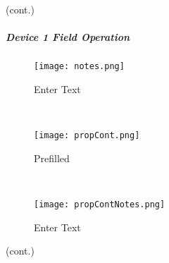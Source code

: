 {\footnotesize (cont.)}
\vspace{.75in}

\vspace{2.75in}

\vspace{2.25in}


\clearpage

\subparagraph*{Device 1 Field Operation}

\begin{wrapfigure}{r}{0.4\textwidth}
\centering
    \texttt{[image: notes.png]}%
\caption {Enter Text}
\vspace{.05in}

\HRule \\[.4cm] %
\vspace{.1in}

    \texttt{[image: propCont.png]}%
\caption {Prefilled}
\vspace{.05in}

\HRule \\[.4cm] %
\vspace{.1in}

    \texttt{[image: propContNotes.png]}
\caption{Enter Text}
\end{wrapfigure}

{\footnotesize (cont.)}
\vspace{.5in}

\vspace{2.25in}

\vspace{3.25in}

\clearpage

